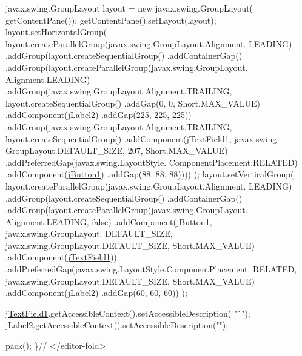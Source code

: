 \begin{DoxyCode}
        javax.swing.GroupLayout layout = \textcolor{keyword}{new} javax.swing.GroupLayout(
      getContentPane());
        getContentPane().setLayout(layout);
        layout.setHorizontalGroup(
            layout.createParallelGroup(javax.swing.GroupLayout.Alignment.
      LEADING)
            .addGroup(layout.createSequentialGroup()
                .addContainerGap()
                .addGroup(layout.createParallelGroup(javax.swing.GroupLayout.
      Alignment.LEADING)
                    .addGroup(javax.swing.GroupLayout.Alignment.TRAILING, 
      layout.createSequentialGroup()
                        .addGap(0, 0, Short.MAX\_VALUE)
                        .addComponent(\hyperlink{classcom_1_1poly_1_1nlp_1_1filekommander_1_1views_1_1_file_kommander_g_u_i_abc00d454e82d9d65d52df7063d61fe99}{jLabel2})
                        .addGap(225, 225, 225))
                    .addGroup(javax.swing.GroupLayout.Alignment.TRAILING, 
      layout.createSequentialGroup()
                        .addComponent(\hyperlink{classcom_1_1poly_1_1nlp_1_1filekommander_1_1views_1_1_file_kommander_g_u_i_a50d44a9170d3b9fe79bd1f26aeaff9df}{jTextField1}, javax.swing.
      GroupLayout.DEFAULT\_SIZE, 207, Short.MAX\_VALUE)
                        .addPreferredGap(javax.swing.LayoutStyle.
      ComponentPlacement.RELATED)
                        .addComponent(\hyperlink{classcom_1_1poly_1_1nlp_1_1filekommander_1_1views_1_1_file_kommander_g_u_i_a7fdc3f53573570f3f345be50e76a0f53}{jButton1})
                        .addGap(88, 88, 88))))
        );
        layout.setVerticalGroup(
            layout.createParallelGroup(javax.swing.GroupLayout.Alignment.
      LEADING)
            .addGroup(layout.createSequentialGroup()
                .addContainerGap()
                .addGroup(layout.createParallelGroup(javax.swing.GroupLayout.
      Alignment.LEADING, \textcolor{keyword}{false})
                    .addComponent(\hyperlink{classcom_1_1poly_1_1nlp_1_1filekommander_1_1views_1_1_file_kommander_g_u_i_a7fdc3f53573570f3f345be50e76a0f53}{jButton1}, javax.swing.GroupLayout.
      DEFAULT\_SIZE, javax.swing.GroupLayout.DEFAULT\_SIZE, Short.MAX\_VALUE)
                    .addComponent(\hyperlink{classcom_1_1poly_1_1nlp_1_1filekommander_1_1views_1_1_file_kommander_g_u_i_a50d44a9170d3b9fe79bd1f26aeaff9df}{jTextField1}))
                .addPreferredGap(javax.swing.LayoutStyle.ComponentPlacement.
      RELATED, javax.swing.GroupLayout.DEFAULT\_SIZE, Short.MAX\_VALUE)
                .addComponent(\hyperlink{classcom_1_1poly_1_1nlp_1_1filekommander_1_1views_1_1_file_kommander_g_u_i_abc00d454e82d9d65d52df7063d61fe99}{jLabel2})
                .addGap(60, 60, 60))
        );

        \hyperlink{classcom_1_1poly_1_1nlp_1_1filekommander_1_1views_1_1_file_kommander_g_u_i_a50d44a9170d3b9fe79bd1f26aeaff9df}{jTextField1}.getAccessibleContext().setAccessibleDescription(\textcolor{stringliteral}{
      "`"});
        \hyperlink{classcom_1_1poly_1_1nlp_1_1filekommander_1_1views_1_1_file_kommander_g_u_i_abc00d454e82d9d65d52df7063d61fe99}{jLabel2}.getAccessibleContext().setAccessibleDescription(\textcolor{stringliteral}{""});

        pack();
    \}\textcolor{comment}{// </editor-fold>}
\end{DoxyCode}
